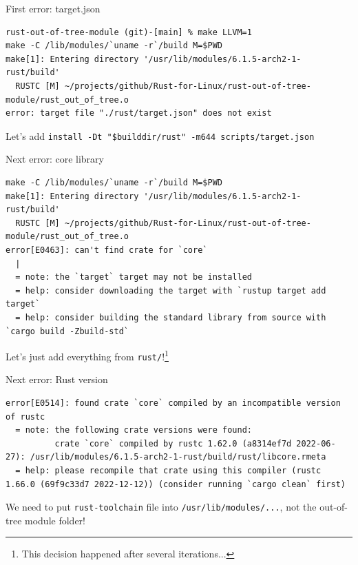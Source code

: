 \begin{frame}[c,fragile]{First error: target.json}
  \begin{verbatim}
rust-out-of-tree-module (git)-[main] % make LLVM=1
make -C /lib/modules/`uname -r`/build M=$PWD
make[1]: Entering directory '/usr/lib/modules/6.1.5-arch2-1-rust/build'
  RUSTC [M] ~/projects/github/Rust-for-Linux/rust-out-of-tree-module/rust_out_of_tree.o
error: target file "./rust/target.json" does not exist
  \end{verbatim}

  \rightarrow{} Let's add \texttt{install -Dt "\$builddir/rust" -m644 scripts/target.json}
\end{frame}

\begin{frame}[c,fragile]{Next error: core library}
  \begin{verbatim}
make -C /lib/modules/`uname -r`/build M=$PWD
make[1]: Entering directory '/usr/lib/modules/6.1.5-arch2-1-rust/build'
  RUSTC [M] ~/projects/github/Rust-for-Linux/rust-out-of-tree-module/rust_out_of_tree.o
error[E0463]: can't find crate for `core`
  |
  = note: the `target` target may not be installed
  = help: consider downloading the target with `rustup target add target`
  = help: consider building the standard library from source with `cargo build -Zbuild-std`

  \end{verbatim}

  \rightarrow{} Let's just add everything from \texttt{rust/}!\footnote{This decision happened after several iterations...}
\end{frame}

\begin{frame}[c,fragile]{Next error: Rust version}
  \begin{verbatim}
error[E0514]: found crate `core` compiled by an incompatible version of rustc
  = note: the following crate versions were found:
          crate `core` compiled by rustc 1.62.0 (a8314ef7d 2022-06-27): /usr/lib/modules/6.1.5-arch2-1-rust/build/rust/libcore.rmeta
  = help: please recompile that crate using this compiler (rustc 1.66.0 (69f9c33d7 2022-12-12)) (consider running `cargo clean` first)
  \end{verbatim}
  \rightarrow{} We need to put \texttt{rust-toolchain} file into \texttt{/usr/lib/modules/...}, not the out-of-tree module folder!
\end{frame}

